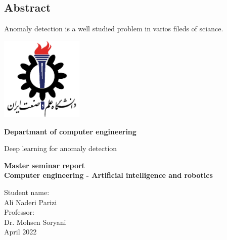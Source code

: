 \documentclass[12pt,a4paper]{report}
\theoremstyle{definition}
\theoremstyle{theorem}
\theoremstyle{definition}
\begin{document}
\printindex
\newpage
\begin{latin}
\chapter*{Abstract}
Anomaly detection is a well studied problem in varios fileds of sciance.

\newpage
\thispagestyle{empty}

	\vspace*{25mm}
	\centerline{\includegraphics[height=4cm]{./images/logos/iust.png}}

	\begin{center}
	\textbf{
Departmant of computer engineering
	}
	\\[1cm]
	\baselineskip=2cm
	{\titr
	\begin{Huge}
	Deep learning for anomaly detection\\[1cm]
	\end{Huge}}
	{\Large 
		\textbf{
			Master seminar report \\
Computer engineering - Artificial intelligence and robotics
		} \\[1cm]
	}

	{\Large { Student name:}
	\\
	{\Large  Ali Naderi Parizi}
	\\[.5cm]
	{\Large  Professor:}
	\\
	{\Large Dr.  Mohsen Soryani}
	\\[.6cm]
	}
April 2022
	\end{center}

\end{latin}
\end{document}
